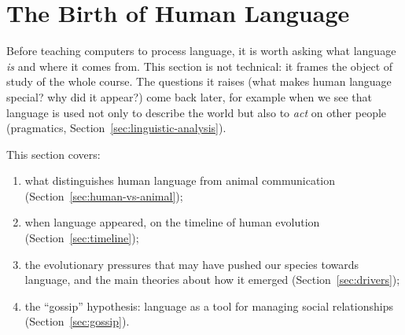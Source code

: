 \section{The Birth of Human Language}
\label{sec:birth-of-language}

Before teaching computers to process language, it is worth asking what language
\emph{is} and where it comes from. This section is not technical: it frames the object
of study of the whole course. The questions it raises (what makes human language
special? why did it appear?) come back later, for example when we see that language is
used not only to describe the world but also to \emph{act} on other people
(pragmatics, Section~\ref{sec:linguistic-analysis}).

This section covers:
\begin{enumerate}[nosep]
  \item what distinguishes human language from animal communication
        (Section~\ref{sec:human-vs-animal});
  \item when language appeared, on the timeline of human evolution
        (Section~\ref{sec:timeline});
  \item the evolutionary pressures that may have pushed our species towards language,
        and the main theories about how it emerged (Section~\ref{sec:drivers});
  \item the ``gossip'' hypothesis: language as a tool for managing social relationships
        (Section~\ref{sec:gossip}).
\end{enumerate}





